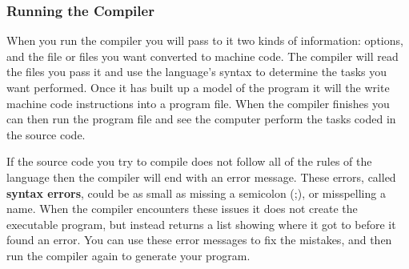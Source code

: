 \clearpage
\subsubsection{Running the Compiler} %
\label{ssub:running_the_compiler}

When you run the compiler you will pass to it two kinds of information: options, and the file or files you want converted to machine code. The compiler will read the files you pass it and use the language's syntax to determine the tasks you want performed. Once it has built up a model of the program it will the write machine code instructions into a program file. When the compiler finishes you can then run the program file and see the computer perform the tasks coded in the source code.



If the source code you try to compile does not follow all of the rules of the language then the compiler will end with an error message. These errors, called \textbf{syntax errors}, could be as small as missing a semicolon (;), or misspelling a name. When the compiler encounters these issues it does not create the executable program, but instead returns a list showing where it got to before it found an error. You can use these error messages to fix the mistakes, and then run the compiler again to generate your program.


